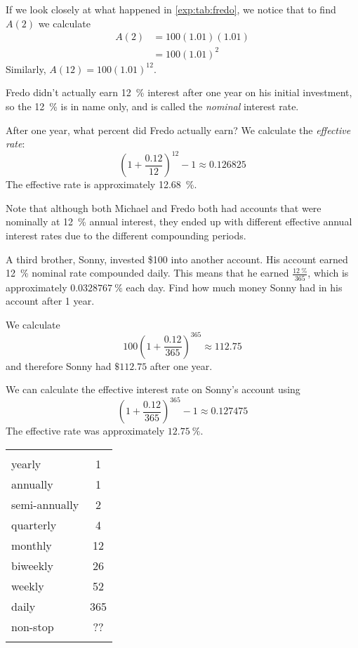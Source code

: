 \begin{pccexample}
	If we look closely at what happened in \cref{exp:tab:fredo}, we notice that 
	to find $A(2)$ we calculate
	\begin{align*}
		A(2) & =  100(1.01)(1.01) \\
		     & =  100(1.01)^2     
	\end{align*}
	Similarly, $A(12)=100(1.01)^{12}$.
										
	Fredo didn't actually earn \SI{12}{\percent} interest after one year on his initial investment, 
	so the \SI{12}{\percent} is in name only, and is called the {\em nominal} 
	interest rate.
										
	After one year, what percent did Fredo actually earn?  We calculate the \emph{effective rate}: 
	\[
		\left( 1+\frac{0.12}{12} \right)^{12}-1\approx 0.126825 
	\] 
	The effective rate is approximately \SI{12.68}{\percent}.
										
	Note that although both Michael and Fredo both had accounts that were nominally at \SI{12}{\percent} annual interest, they ended up with different effective annual interest rates due to the different compounding periods.  
										
	A third brother, Sonny, invested \$100 into another account. His account earned 
	\SI{12}{\percent} nominal rate compounded daily. This means that he earned $\frac{\SI{12}{\percent}}{365}$, which is approximately 
	$\SI{0.0328767}{\percent}$ each day. 
	Find how much money Sonny had in his account after 1 year. 
										
	We calculate
	\[
		100\left(1+\frac{0.12}{365}  \right)^{365}\approx 112.75
	\]
	and therefore Sonny had $\$112.75$ after one year. 
										
	We can calculate the effective interest rate on Sonny's account using
	\[
		\left( 1+\frac{0.12}{365} \right)^{365}-1\approx  0.127475
	\]
	The effective rate was approximately $\SI{12.75}{\percent}$.
\end{pccexample}
			
\begin{margintable}
	\centering
	\begin{tabular}{lS[table-format=3.0]}
		\beforeheading
		 &  \\
		\afterheading
		yearly          & 1             \\\normalline
		annually        & 1             \\\normalline
		semi-annually   & 2             \\\normalline
		quarterly       & 4             \\\normalline
		monthly         & 12            \\\normalline
		biweekly        & 26            \\\normalline
		weekly          & 52            \\\normalline
		daily           & 365           \\\normalline
		non-stop        & \mbox{??}     \\\lastline
	\end{tabular}
	\label{exp:tab:compoundingfreq}
\end{margintable}
			
